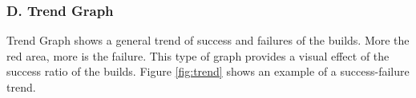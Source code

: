 \documentclass[10pt]{ruthesis}
\begin{document}

\subsubsection{\textbf{D. Trend Graph}}
Trend Graph shows a general trend of success and failures of the builds. More the red area, more is the failure. This type of graph provides a visual effect of the success ratio of the builds. Figure \ref{fig:trend} shows an example of a success-failure trend.
\end{document}

